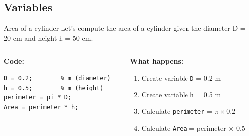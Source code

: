 \documentclass[aspectratio=169]{beamer}
\begin{document}
\subsection{Variables}
\begin{frame}[fragile]{Area of a cylinder}
    \large \textcolor{NavyBlue}{Let's compute the area of a cylinder given the diameter D = 20 cm and height h = 50 cm}.

    \begin{columns}
        \begin{column}{0.5\textwidth}
            \textbf{Code:}
            \begin{verbatim}
D = 0.2;        % m (diameter)
h = 0.5;        % m (height)
perimeter = pi * D;
Area = perimeter * h;
            \end{verbatim}
        \end{column}
        \begin{column}{0.5\textwidth}
            \textbf{What happens:}
            \begin{enumerate}
                \item Create variable \texttt{D} = 0.2 m
                \item Create variable \texttt{h} = 0.5 m
                \item Calculate \texttt{perimeter} = $\pi \times 0.2$
                \item Calculate \texttt{Area} = perimeter $\times$ 0.5
            \end{enumerate}
        \end{column}
    \end{columns}
\end{frame}
\end{document}
